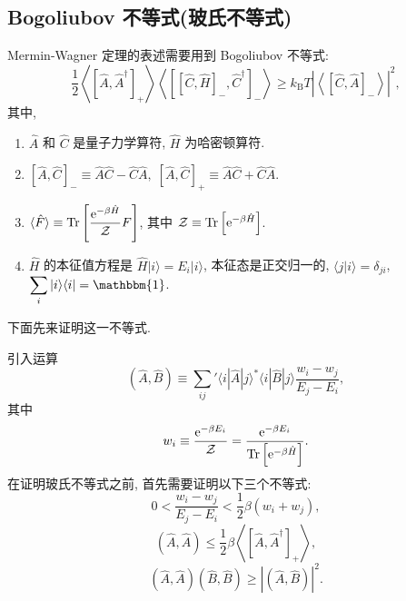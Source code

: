 \subsection{Bogoliubov 不等式(玻氏不等式)}

Mermin-Wagner 定理的表述需要用到 Bogoliubov 不等式:
\begin{equation}
    \frac{1}{2}\left\langle \left[ \hat{A},\hat{A}^\dagger \right]_+ \right\rangle\left\langle \left[ [ \hat{C},\hat{H} ]_-,\hat{C}^\dagger \right]_- \right\rangle\ge k_{\mathrm{B}}T\left| \left\langle \left[ \hat{C},\hat{A} \right]_- \right\rangle \right|^2,
\label{uneq-1}
\end{equation}
其中,
\begin{enumerate}
    \item $\hat{A}$ 和 $\hat{C}$ 是量子力学算符, $\hat{H}$ 为哈密顿算符.
    \item $\displaystyle \left[ \hat{A},\hat{C} \right]_-\equiv \hat{A}\hat{C}-\hat{C}\hat{A},\; \left[ \hat{A},\hat{C} \right]_+\equiv \hat{A}\hat{C}+\hat{C}\hat{A}$.
    \item $\displaystyle \langle \hat{F} \rangle\equiv \mathrm{Tr}\left[ \frac{\mathrm{e}^{-\beta\hat{H}}}{\mathcal{Z}}F \right]$, 其中 $\mathcal{Z}\equiv \mathrm{Tr}\left[ \mathrm{e}^{-\beta\hat{H}} \right]$.
    \item $\hat{H}$ 的本征值方程是 $\hat{H}|i\rangle=E_i|i\rangle$, 本征态是正交归一的, $\langle j|i \rangle=\delta_{ji}$, $\displaystyle\sum_i|i\rangle\langle i|=\mathbbm{1}$.
\end{enumerate}
下面先来证明这一不等式.

引入运算
\begin{equation}
    \left( \hat{A},\hat{B} \right)\equiv \sum_{ij}^{ }{}'\langle i|\hat{A}|j\rangle^*\langle i|\hat{B}|j \rangle\frac{w_i-w_j}{E_j-E_i},
\label{uneq-2}
\end{equation}
其中 
\begin{equation}
    w_i\equiv \frac{\mathrm{e}^{-\beta E_i}}{\mathcal{Z}}=\frac{\mathrm{e}^{-\beta E_i}}{\mathrm{Tr}\left[ \mathrm{e}^{-\beta\hat{H}} \right]}.
\end{equation}
在证明玻氏不等式之前, 首先需要证明以下三个不等式:
\begin{equation}
    0<\frac{w_i-w_j}{E_j-E_i}<\frac{1}{2}\beta(w_i+w_j),\label{uneq-3}
\end{equation}
\begin{equation}
    \left( \hat{A},\hat{A} \right)\le \frac{1}{2}\beta\left\langle \left[ \hat{A},\hat{A}^\dagger \right]_+ \right\rangle,\label{uneq-4}
\end{equation}
\begin{equation}
    \left( \hat{A},\hat{A} \right)\left( \hat{B},\hat{B} \right)\ge\left| \left( \hat{A},\hat{B} \right) \right|^2.\label{uneq-5}
\end{equation}

